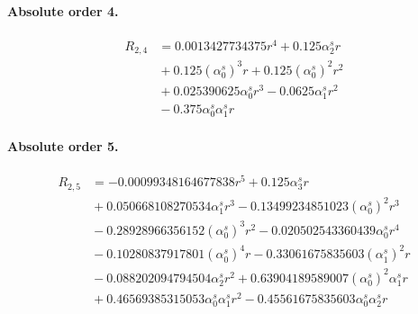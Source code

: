 \documentclass[10pt]{article}
\begin{document}
\paragraph{Absolute order 4.}
\begin{align*}
R_{2,4} &= 0.0013427734375 r^{4} + 0.125 \alpha_{2}^s r \\
&{}  + 0.125 \left(\alpha_{0}^s\right)^{3} r + 0.125 \left(\alpha_{0}^s\right)^{2} r^{2} \\
&{}  + 0.025390625 \alpha_{0}^s r^{3} - 0.0625 \alpha_{1}^s r^{2} \\
&{}  - 0.375 \alpha_{0}^s \alpha_{1}^s r
\end{align*}

\paragraph{Absolute order 5.}
\begin{align*}
R_{2,5} &=  - 0.00099348164677838 r^{5} + 0.125 \alpha_{3}^s r \\
&{}  + 0.050668108270534 \alpha_{1}^s r^{3} - 0.13499234851023 \left(\alpha_{0}^s\right)^{2} r^{3} \\
&{}  - 0.28928966356152 \left(\alpha_{0}^s\right)^{3} r^{2} - 0.020502543360439 \alpha_{0}^s r^{4} \\
&{}  - 0.10280837917801 \left(\alpha_{0}^s\right)^{4} r - 0.33061675835603 \left(\alpha_{1}^s\right)^{2} r \\
&{}  - 0.088202094794504 \alpha_{2}^s r^{2} + 0.63904189589007 \left(\alpha_{0}^s\right)^{2} \alpha_{1}^s r \\
&{}  + 0.46569385315053 \alpha_{0}^s \alpha_{1}^s r^{2} - 0.45561675835603 \alpha_{0}^s \alpha_{2}^s r
\end{align*}
\end{document}
